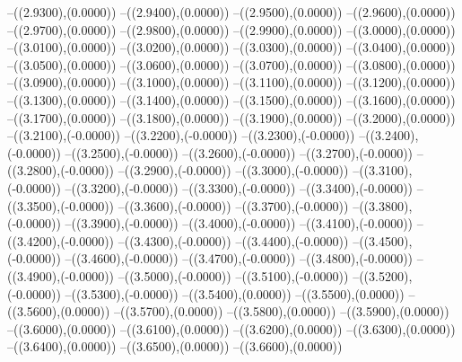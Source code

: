 {	--({\sx*(2.9300)},{\sy*(0.0000)})
	--({\sx*(2.9400)},{\sy*(0.0000)})
	--({\sx*(2.9500)},{\sy*(0.0000)})
	--({\sx*(2.9600)},{\sy*(0.0000)})
	--({\sx*(2.9700)},{\sy*(0.0000)})
	--({\sx*(2.9800)},{\sy*(0.0000)})
	--({\sx*(2.9900)},{\sy*(0.0000)})
	--({\sx*(3.0000)},{\sy*(0.0000)})
	--({\sx*(3.0100)},{\sy*(0.0000)})
	--({\sx*(3.0200)},{\sy*(0.0000)})
	--({\sx*(3.0300)},{\sy*(0.0000)})
	--({\sx*(3.0400)},{\sy*(0.0000)})
	--({\sx*(3.0500)},{\sy*(0.0000)})
	--({\sx*(3.0600)},{\sy*(0.0000)})
	--({\sx*(3.0700)},{\sy*(0.0000)})
	--({\sx*(3.0800)},{\sy*(0.0000)})
	--({\sx*(3.0900)},{\sy*(0.0000)})
	--({\sx*(3.1000)},{\sy*(0.0000)})
	--({\sx*(3.1100)},{\sy*(0.0000)})
	--({\sx*(3.1200)},{\sy*(0.0000)})
	--({\sx*(3.1300)},{\sy*(0.0000)})
	--({\sx*(3.1400)},{\sy*(0.0000)})
	--({\sx*(3.1500)},{\sy*(0.0000)})
	--({\sx*(3.1600)},{\sy*(0.0000)})
	--({\sx*(3.1700)},{\sy*(0.0000)})
	--({\sx*(3.1800)},{\sy*(0.0000)})
	--({\sx*(3.1900)},{\sy*(0.0000)})
	--({\sx*(3.2000)},{\sy*(0.0000)})
	--({\sx*(3.2100)},{\sy*(-0.0000)})
	--({\sx*(3.2200)},{\sy*(-0.0000)})
	--({\sx*(3.2300)},{\sy*(-0.0000)})
	--({\sx*(3.2400)},{\sy*(-0.0000)})
	--({\sx*(3.2500)},{\sy*(-0.0000)})
	--({\sx*(3.2600)},{\sy*(-0.0000)})
	--({\sx*(3.2700)},{\sy*(-0.0000)})
	--({\sx*(3.2800)},{\sy*(-0.0000)})
	--({\sx*(3.2900)},{\sy*(-0.0000)})
	--({\sx*(3.3000)},{\sy*(-0.0000)})
	--({\sx*(3.3100)},{\sy*(-0.0000)})
	--({\sx*(3.3200)},{\sy*(-0.0000)})
	--({\sx*(3.3300)},{\sy*(-0.0000)})
	--({\sx*(3.3400)},{\sy*(-0.0000)})
	--({\sx*(3.3500)},{\sy*(-0.0000)})
	--({\sx*(3.3600)},{\sy*(-0.0000)})
	--({\sx*(3.3700)},{\sy*(-0.0000)})
	--({\sx*(3.3800)},{\sy*(-0.0000)})
	--({\sx*(3.3900)},{\sy*(-0.0000)})
	--({\sx*(3.4000)},{\sy*(-0.0000)})
	--({\sx*(3.4100)},{\sy*(-0.0000)})
	--({\sx*(3.4200)},{\sy*(-0.0000)})
	--({\sx*(3.4300)},{\sy*(-0.0000)})
	--({\sx*(3.4400)},{\sy*(-0.0000)})
	--({\sx*(3.4500)},{\sy*(-0.0000)})
	--({\sx*(3.4600)},{\sy*(-0.0000)})
	--({\sx*(3.4700)},{\sy*(-0.0000)})
	--({\sx*(3.4800)},{\sy*(-0.0000)})
	--({\sx*(3.4900)},{\sy*(-0.0000)})
	--({\sx*(3.5000)},{\sy*(-0.0000)})
	--({\sx*(3.5100)},{\sy*(-0.0000)})
	--({\sx*(3.5200)},{\sy*(-0.0000)})
	--({\sx*(3.5300)},{\sy*(-0.0000)})
	--({\sx*(3.5400)},{\sy*(0.0000)})
	--({\sx*(3.5500)},{\sy*(0.0000)})
	--({\sx*(3.5600)},{\sy*(0.0000)})
	--({\sx*(3.5700)},{\sy*(0.0000)})
	--({\sx*(3.5800)},{\sy*(0.0000)})
	--({\sx*(3.5900)},{\sy*(0.0000)})
	--({\sx*(3.6000)},{\sy*(0.0000)})
	--({\sx*(3.6100)},{\sy*(0.0000)})
	--({\sx*(3.6200)},{\sy*(0.0000)})
	--({\sx*(3.6300)},{\sy*(0.0000)})
	--({\sx*(3.6400)},{\sy*(0.0000)})
	--({\sx*(3.6500)},{\sy*(0.0000)})
	--({\sx*(3.6600)},{\sy*(0.0000)})
}
